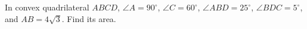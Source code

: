 In convex quadrilateral $ABCD$, $\angle A=90^\circ$, $\angle C=60^\circ$, $\angle ABD=25^\circ$, $\angle BDC=5^\circ$, and $AB=4\sqrt3$. Find its area.
